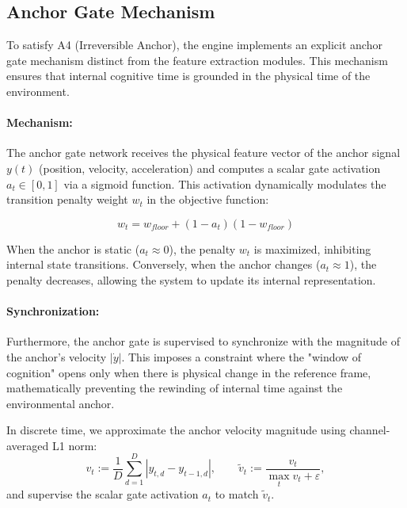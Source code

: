 \documentclass{article}
\begin{document}
\subsection{Anchor Gate Mechanism}
To satisfy A4 (Irreversible Anchor), the engine implements an explicit anchor gate mechanism distinct from the feature extraction modules. This mechanism ensures that internal cognitive time is grounded in the physical time of the environment.

\paragraph{Mechanism:}
The anchor gate network receives the physical feature vector of the anchor signal $y(t)$ (position, velocity, acceleration) and computes a scalar gate activation $a_t \in [0, 1]$ via a sigmoid function. This activation dynamically modulates the transition penalty weight $w_t$ in the objective function:

\begin{equation}
    w_t = w_{floor} + (1 - a_t)(1 - w_{floor})
    \label{eq:anchor_weight}
\end{equation}

When the anchor is static ($a_t \approx 0$), the penalty $w_t$ is maximized, inhibiting internal state transitions. Conversely, when the anchor changes ($a_t \approx 1$), the penalty decreases, allowing the system to update its internal representation.

\paragraph{Synchronization:}
Furthermore, the anchor gate is supervised to synchronize with the magnitude of the anchor's velocity $|\dot{y}|$. This imposes a constraint where the "window of cognition" opens only when there is physical change in the reference frame, mathematically preventing the rewinding of internal time against the environmental anchor.

In discrete time, we approximate the anchor velocity magnitude using channel-averaged L1 norm:
\begin{equation}
v_t := \frac{1}{D}\sum_{d=1}^{D} |y_{t,d} - y_{t-1,d}|,
\qquad
\tilde{v}_t := \frac{v_t}{\max_{t} v_t + \varepsilon},
\label{eq:anchor_velocity}
\end{equation}
and supervise the scalar gate activation $a_t$ to match $\tilde{v}_t$.
\end{document}

